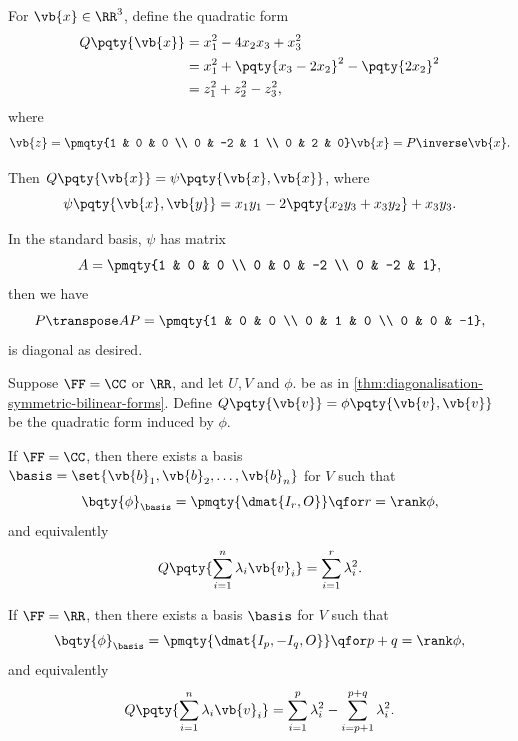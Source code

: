 \begin{example}
    For \(\vb{x} \in \RR^3\), define the quadratic form
    \begin{align*}
        Q\pqty{\vb{x}} &= x_1^2 - 4 x_2 x_3 + x_3^2 \\
        &= x_1^2 + \pqty{x_3 - 2 x_2}^2 - \pqty{2 x_2}^2 \\
        &= z_1^2 + z_2^2 - z_3^2,
    \end{align*}
    where
    \[
        \vb{z} = \pmqty{1 & 0 & 0 \\ 0 & -2 & 1 \\ 0 & 2 & 0} \vb{x} = P\inverse \vb{x}.
    \]

    Then \(Q \pqty{\vb{x}} = \psi\pqty{\vb{x}, \vb{x}}\), where
    \[
        \psi\pqty{\vb{x}, \vb{y}} = x_1 y_1 - 2 \pqty{x_2 y_3 + x_3 y_2} + x_3 y_3.
    \]

    In the standard basis, \(\psi\) has matrix
    \[
        A = \pmqty{1 & 0 & 0 \\ 0 & 0 & -2 \\ 0 & -2 & 1},
    \]
    then we have
    \[
        P\transpose A P = \pmqty{1 & 0 & 0 \\ 0 & 1 & 0 \\ 0 & 0 & -1},
    \]
    is diagonal as desired.
\end{example}

\begin{corollary}
    \label{cor:diagonalisation-symmetric-bilinear-forms-over-r-and-c}%
    Suppose \(\FF = \CC\) or \(\RR\), and let \(U, V\) and \(\phi\). be as in \autoref{thm:diagonalisation-symmetric-bilinear-forms}. Define \(Q\pqty{\vb{v}} = \phi\pqty{\vb{v}, \vb{v}}\) be the quadratic form induced by \(\phi\).

    If \(\FF = \CC\), then there exists a basis \(\basis = \set{\vb{b}_1, \vb{b}_2, \ldots, \vb{b}_n}\) for \(V\) such that
    \[
        \bqty{\phi}_{\basis} = \pmqty{\dmat{I_r, O}} \qfor r = \rank \phi,
    \]
    and equivalently
    \[
        Q\pqty{\sum_{i = 1}^{n} \lambda_i \vb{v}_i} = \sum_{i = 1}^{r} \lambda_i^2.
    \]

    If \(\FF = \RR\), then there exists a basis \(\basis\) for \(V\) such that
    \[
        \bqty{\phi}_{\basis} = \pmqty{\dmat{I_p, -I_q, O}} \qfor p + q = \rank \phi,
    \]
    and equivalently
    \[
        Q\pqty{\sum_{i = 1}^{n} \lambda_i \vb{v}_i} = \sum_{i = 1}^{p} \lambda_i^2 - \sum_{i = p + 1}^{p + q} \lambda_i^2.
    \]
\end{corollary}

